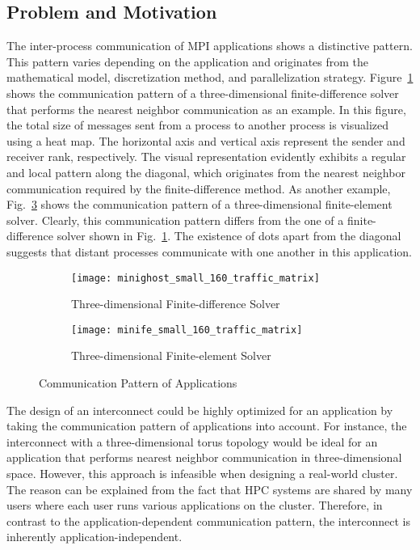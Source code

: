 \subsection{Problem and Motivation}\label{sec:i-problem}

The inter-process communication of MPI applications shows a distinctive
pattern. This pattern varies depending on the application and originates from
the mathematical model, discretization method, and parallelization strategy.
Figure~\ref{fig:minighost} shows the communication pattern of a
three-dimensional finite-difference solver that performs the nearest neighbor
communication as an example. In this figure, the total size of messages sent
from a process to another process is visualized using a heat map. The
horizontal axis and vertical axis represent the sender and receiver rank,
respectively. The visual representation evidently exhibits a regular and local
pattern along the diagonal, which originates from the nearest neighbor
communication required by the finite-difference method. As another example,
Fig.~\ref{fig:minife} shows the communication pattern of a three-dimensional
finite-element solver. Clearly, this communication pattern differs from the
one of a finite-difference solver shown in Fig.~\ref{fig:minighost}. The
existence of dots apart from the diagonal suggests that distant processes
communicate with one another in this application.

\begin{figure}
    \centering
    \begin{subfigure}{\linewidth}
        \centering
        \texttt{[image: minighost\_small\_160\_traffic\_matrix]}
        \caption{Three-dimensional Finite-difference Solver}%
        \label{fig:minighost}
    \end{subfigure}
    \begin{subfigure}{\linewidth}
        \centering
        \texttt{[image: minife\_small\_160\_traffic\_matrix]}
        \caption{Three-dimensional Finite-element Solver}%
        \label{fig:minife}
    \end{subfigure}
    \caption{Communication Pattern of Applications}
\end{figure}

The design of an interconnect could be highly optimized for an
application by taking the communication pattern of applications into account.
For instance, the interconnect with a three-dimensional torus topology would
be ideal for an application that performs nearest neighbor communication in
three-dimensional space. However, this approach is infeasible when designing a
real-world cluster. The reason can be explained from the fact that HPC systems
are shared by many users where each user runs various applications on the
cluster. Therefore, in contrast to the application-dependent communication
pattern, the interconnect is inherently application-independent.

